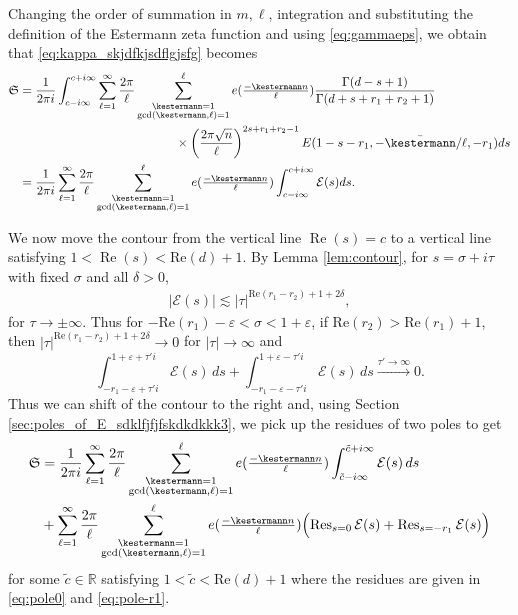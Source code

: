 \documentclass[]{article}
\renewcommand{\Re}{\operatorname{Re}}
\newcommand{\mathcalSsumdef}{\mathfrak{S}}
\newcommand{\sumk}{\sum_{\substack{\kestermann = 1 \\ \gcd(\kestermann,\ell) = 1}}^\ell}
\newcommand{\kf}[1]{{\color{magenta}{#1}}}
\newcommand{\kkl}[1]{{\color{orange}{#1}}}
\begin{document}
Changing the order of summation in $m, \ell$, integration and substituting the definition of the Estermann zeta function and using \eqref{eq:gammaeps}, we obtain that  \eqref{eq:kappa_skjdfkjsdflgjsfg} becomes
\begin{align}
	\mathcalSsumdef &= \frac{1}{2 \pi i} \int_{c-i \infty}^{c+i \infty}  \sum_{\ell=1}^\infty \frac{2 \pi }{\ell}   \sumk e(\tfrac{-\kestermann n}{\ell}) \frac{   \Gamma(d-s+1)  }{\Gamma (d+s+r_1+r_2+1)  }   \\
    & \ \ \ \ \ \ \ \ \ \ \ \ \ \ \ \ \ \ \ \ \ \ \ \ \ \ \ \ \ \ \ \ \ \ \ \ \ \ \times \left( \frac{2 \pi \sqrt{n}}{\ell} \right)^{2s+r_1+r_2-1} E(1-s-r_1,-\bar{\kestermann}/\ell,-r_1)  ds\nonumber \\  
    &=\frac{1}{2 \pi i}   \sum_{\ell=1}^\infty \frac{2 \pi }{\ell}   \sumk e(\tfrac{-\kestermann n}{\ell}) \int_{c-i \infty}^{c+i \infty}\mathcal{E}(s) ds.
\end{align}


We now move the contour from the vertical line $\Re(s) = c$ to a vertical line satisfying $1< \Re(s) <\text{Re}(d)+1$.
By Lemma \ref{lem:contour}, for $s=\sigma+i\tau$ with fixed $\sigma$ and all $\delta>0$, %
\begin{equation}\label{eq:asymp_Omega1}
\begin{split}
    |\mathcal{E}(s) |   \lesssim |\tau|^{{\text{Re}(r_1-r_2)+1+2\delta}},
\end{split}
\end{equation}
for $ \tau \to \pm \infty$. Thus for $-\text{Re}(r_1)-\varepsilon < \sigma < 1 + \varepsilon$,
if $\text{Re}(r_2)>\text{Re}(r_1)+1$, then $|\tau|^{\text{Re}(r_1-r_2)+1+2\delta} \to 0$ for $|\tau|\to \infty$ and
\newcommand{\Rbig}{\tau'}
\begin{equation}\label{eq:horizontal_contour_vanishes}
    \int_{-r_1-\varepsilon + \Rbig i}^{1+\varepsilon + \Rbig i} \mathcal{E}(s) \, ds  +     \int_{-r_1-\varepsilon - \Rbig i}^{1+\varepsilon - \Rbig i} \mathcal{E}(s) \, ds  \stackrel{\Rbig \to \infty}{\to} 0.
\end{equation}
Thus we can shift of the contour to the right and, using Section \ref{sec:poles_of_E_sdklfjfjfskdkdkkk3}, we pick up the residues of two poles to get%
\begin{equation}\label{eq:intermediate_integral_petersson_backwards_sdfsdfsdeee3324}
	\begin{split}
	\mathcalSsumdef   
    &=\frac{1}{2 \pi i}   \sum_{\ell=1}^\infty \frac{2 \pi }{\ell}   \sumk e(\tfrac{-\kestermann n}{\ell}) \int_{\tilde c-i \infty}^{\tilde c+i \infty}\mathcal{E}(s)\, ds \\
    & +  \sum_{\ell=1}^\infty \frac{2 \pi }{\ell}    \sumk e(\tfrac{-\kestermann n}{\ell})\Big( \text{Res}_{s=0}\,\mathcal{E}(s)+ \text{Res}_{s=-r_1}\,\mathcal{E}(s)\Big)
	\end{split}
\end{equation}
for some $\tilde c \in \mathbb{R}$ satisfying $1<\tilde c <\text{Re}(d)+1$ where the residues are given in \eqref{eq:pole0} and \eqref{eq:pole-r1}.
\end{document}
